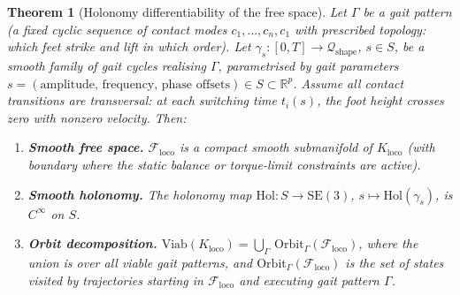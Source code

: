 \documentclass[11pt,a4paper]{article}
\newtheorem{theorem}{Theorem}[section]
\newcommand{\R}{\mathbb{R}}
\newcommand{\cF}{\mathcal{F}}
\begin{document}
\begin{theorem}[Holonomy differentiability of the free space]
\label{thm:holonomy-diff}
Let $\Gamma$ be a gait pattern
(a fixed cyclic sequence of contact modes
$c_1, \ldots, c_n, c_1$
with prescribed topology:
which feet strike and lift in which order).
Let $\gamma_s : [0, T] \to \mathcal{Q}_{\mathrm{shape}}$,
$s \in S$,
be a smooth family of gait cycles
realising $\Gamma$,
parametrised by gait parameters
$s = (\text{amplitude, frequency, phase offsets})
\in S \subset \R^p$.
Assume all contact transitions are \emph{transversal}:
at each switching time $t_i(s)$,
the foot height crosses zero
with nonzero velocity.
Then:
\begin{enumerate}[nosep]
\item \textbf{Smooth free space.}\;
  $\cF_{\mathrm{loco}}$ is a compact smooth
  submanifold of $K_{\mathrm{loco}}$
  (with boundary where the static balance
  or torque-limit constraints are active).
\item \textbf{Smooth holonomy.}\;
  The holonomy map
  $\mathrm{Hol} : S \to \mathrm{SE}(3)$,\;
  $s \mapsto \mathrm{Hol}(\gamma_s)$,
  is $C^\infty$ on $S$.
\item \textbf{Orbit decomposition.}\;
  $\mathrm{Viab}(K_{\mathrm{loco}})
    = \bigcup_{\Gamma}\,
      \mathrm{Orbit}_\Gamma(\cF_{\mathrm{loco}})$,
  where the union is over all viable gait patterns,
  and
  $\mathrm{Orbit}_\Gamma(\cF_{\mathrm{loco}})$
  is the set of states visited by trajectories
  starting in $\cF_{\mathrm{loco}}$
  and executing gait pattern $\Gamma$.
\end{enumerate}
\end{theorem}
\end{document}
